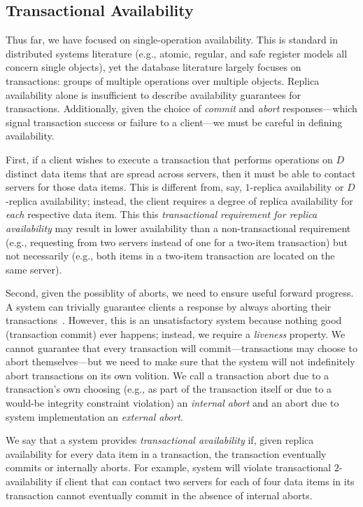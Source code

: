 \subsection{Transactional Availability}

Thus far, we have focused on single-operation availability. This is
standard in distributed systems literature (e.g., atomic, regular, and
safe register models all concern single objects), yet the database
literature largely focuses on transactions: groups of multiple
operations over multiple objects. Replica availability alone is
insufficient to describe availability guarantees for
transactions. Additionally, given the choice of \textit{commit} and
\textit{abort} responses---which signal transaction success or failure
to a client---we must be careful in defining availability.

First, if a client wishes to execute a transaction that performs
operations on $D$ distinct data items that are spread across servers,
then it must be able to contact servers for those data items. This is
different from, say, $1$-replica availability or $D$-replica
availability; instead, the client requires a degree of replica
availability for \textit{each} respective data item. This this
\textit{transactional requirement for replica availability} may result
in lower availability than a non-transactional requirement (e.g.,
requesting from two servers instead of one for a two-item transaction)
but not necessarily (e.g., both items in a two-item transaction are
located on the same server).

Second, given the possiblity of aborts, we need to ensure useful
forward progress. A system can trivially guarantee clients a response
by always aborting their
transactions~\cite{transaction-liveness}. However, this is an
unsatisfactory system because nothing good (transaction commit) ever
happens; instead, we require a \textit{liveness} property. We cannot
guarantee that every transaction will commit---transactions may choose
to abort themselves---but we need to make sure that the system will
not indefinitely abort transactions on its own volition. We call a
transaction abort due to a transaction's own choosing (e.g., as part
of the transaction itself or due to a would-be integrity constraint
violation) an \textit{internal abort} and an abort due to system
implementation an \textit{external abort}.

We say that a system provides \textit{transactional availability} if,
given replica availability for every data item in a transaction, the
transaction eventually commits or internally aborts. For example,
system will violate transactional $2$-availability if client that can
contact two servers for each of four data items in its transaction
cannot eventually commit in the absence of internal aborts.

